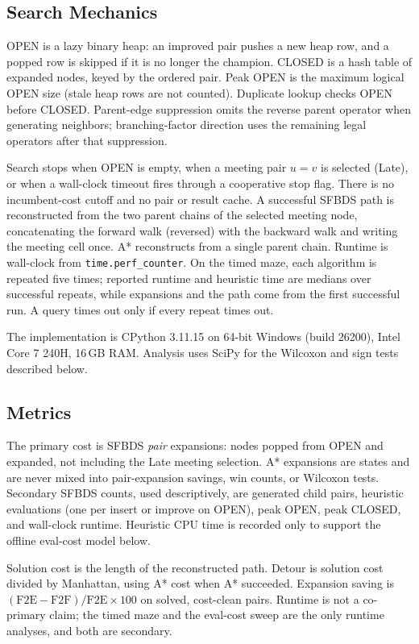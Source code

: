\subsection{Search Mechanics}

OPEN is a lazy binary heap: an improved pair pushes a new heap row, and a popped row is skipped if it is no longer the champion. CLOSED is a hash table of expanded nodes, keyed by the ordered pair. Peak OPEN is the maximum logical OPEN size (stale heap rows are not counted). Duplicate lookup checks OPEN before CLOSED. Parent-edge suppression omits the reverse parent operator when generating neighbors; branching-factor direction uses the remaining legal operators after that suppression.

Search stops when OPEN is empty, when a meeting pair \(u=v\) is selected (Late), or when a wall-clock timeout fires through a cooperative stop flag. There is no incumbent-cost cutoff and no pair or result cache. A successful SFBDS path is reconstructed from the two parent chains of the selected meeting node, concatenating the forward walk (reversed) with the backward walk and writing the meeting cell once. A* reconstructs from a single parent chain. Runtime is wall-clock from \texttt{time.perf\_counter}. On the timed maze, each algorithm is repeated five times; reported runtime and heuristic time are medians over successful repeats, while expansions and the path come from the first successful run. A query times out only if every repeat times out.

The implementation is CPython 3.11.15 on 64-bit Windows (build 26200), Intel Core 7 240H, 16\,GB RAM. Analysis uses SciPy for the Wilcoxon and sign tests described below.

\subsection{Metrics}

The primary cost is SFBDS \emph{pair} expansions: nodes popped from OPEN and expanded, not including the Late meeting selection. A* expansions are states and are never mixed into pair-expansion savings, win counts, or Wilcoxon tests. Secondary SFBDS counts, used descriptively, are generated child pairs, heuristic evaluations (one per insert or improve on OPEN), peak OPEN, peak CLOSED, and wall-clock runtime. Heuristic CPU time is recorded only to support the offline eval-cost model below.

Solution cost is the length of the reconstructed path. Detour is solution cost divided by Manhattan, using A* cost when A* succeeded. Expansion saving is \((\mathrm{F2E}-\mathrm{F2F})/\mathrm{F2E}\times 100\) on solved, cost-clean pairs. Runtime is not a co-primary claim; the timed maze and the eval-cost sweep are the only runtime analyses, and both are secondary.

